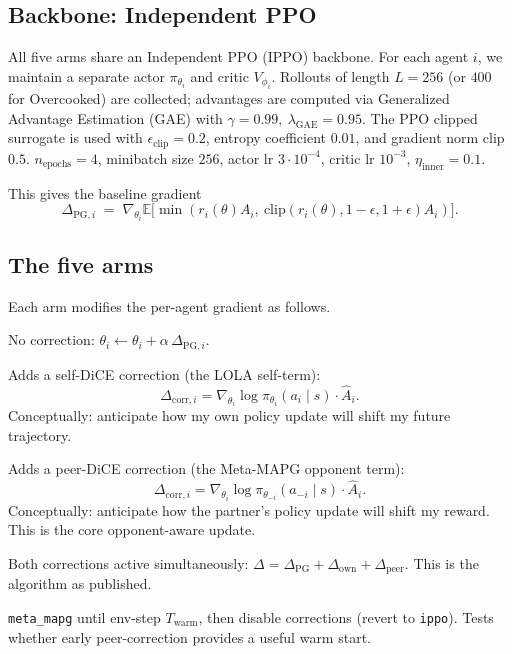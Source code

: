 \documentclass[11pt,a4paper]{article}
\newcommand{\arm}[1]{\texttt{#1}}
\newcommand{\Twarm}{T_{\text{warm}}}
\begin{document}
\subsection{Backbone: Independent PPO}

All five arms share an Independent PPO (IPPO) backbone.
For each agent $i$, we maintain a separate actor $\pi_{\theta_i}$ and critic $V_{\phi_i}$.
Rollouts of length $L = 256$ (or $400$ for Overcooked) are collected; advantages are computed via Generalized Advantage Estimation (GAE) with $\gamma = 0.99,\ \lambda_{\text{GAE}} = 0.95$.
The PPO clipped surrogate is used with $\epsilon_{\text{clip}} = 0.2$, entropy coefficient $0.01$, and gradient norm clip $0.5$.
$n_{\text{epochs}} = 4$, minibatch size $256$, actor lr $3 \cdot 10^{-4}$, critic lr $10^{-3}$, $\eta_{\text{inner}} = 0.1$.

This gives the baseline gradient
\begin{equation}
    \Delta_{\text{PG},i} \;=\; \nabla_{\theta_i} \mathbb{E}\big[ \min(r_i(\theta) A_i,\ \mathrm{clip}(r_i(\theta), 1-\epsilon, 1+\epsilon) A_i) \big].
\end{equation}

\subsection{The five arms}

Each arm modifies the per-agent gradient as follows.
\begin{description}[leftmargin=2.0em,style=nextline]
\item[\arm{ippo}] No correction: $\theta_i \leftarrow \theta_i + \alpha\, \Delta_{\text{PG},i}$.

\item[\arm{own\_only}] Adds a self-DiCE correction (the LOLA self-term):
\begin{equation*}
    \Delta_{\text{corr},i} = \nabla_{\theta_i} \log \pi_{\theta_i}(a_i \mid s) \cdot \hat{A}_i.
\end{equation*}
Conceptually: anticipate how my own policy update will shift my future trajectory.

\item[\arm{peer\_only}] Adds a peer-DiCE correction (the Meta-MAPG opponent term):
\begin{equation*}
    \Delta_{\text{corr},i} = \nabla_{\theta_i} \log \pi_{\theta_{-i}}(a_{-i} \mid s) \cdot \hat{A}_i.
\end{equation*}
Conceptually: anticipate how the partner's policy update will shift my reward.
This is the core opponent-aware update.

\item[\arm{meta\_mapg}] Both corrections active simultaneously: $\Delta = \Delta_{\text{PG}} + \Delta_{\text{own}} + \Delta_{\text{peer}}$.
This is the algorithm as published.

\item[\arm{handoff}] \arm{meta\_mapg} until env-step $\Twarm$, then disable corrections (revert to \arm{ippo}).
Tests whether early peer-correction provides a useful warm start.
\end{description}
\end{document}
